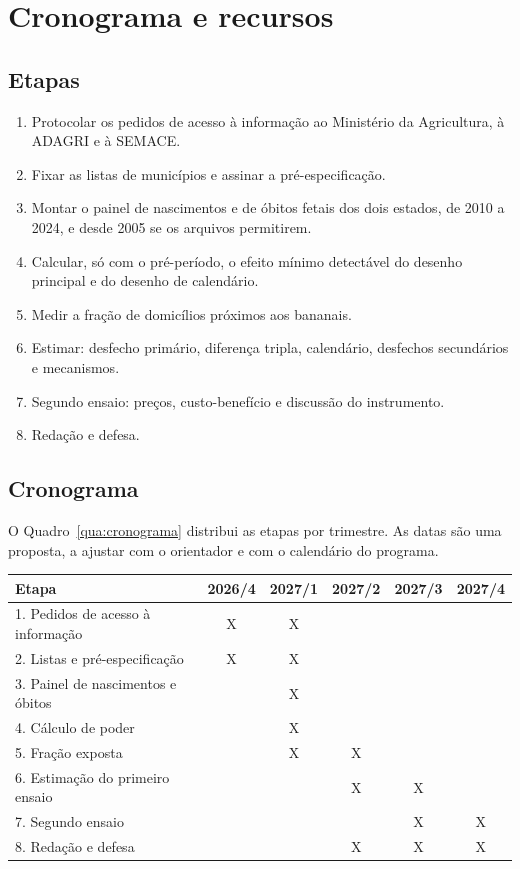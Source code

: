 \chapter{Cronograma e recursos}
\label{sec:cronograma}

\section{Etapas}

\begin{enumerate}
\item Protocolar os pedidos de acesso à informação ao Ministério da
Agricultura, à ADAGRI e à SEMACE.
\item Fixar as listas de municípios e assinar a pré-especificação.
\item Montar o painel de nascimentos e de óbitos fetais dos dois estados, de
2010 a 2024, e desde 2005 se os arquivos permitirem.
\item Calcular, só com o pré-período, o efeito mínimo detectável do desenho
principal e do desenho de calendário.
\item Medir a fração de domicílios próximos aos bananais.
\item Estimar: desfecho primário, diferença tripla, calendário, desfechos
secundários e mecanismos.
\item Segundo ensaio: preços, custo-benefício e discussão do instrumento.
\item Redação e defesa.
\end{enumerate}

\section{Cronograma}

O Quadro~\ref{qua:cronograma} distribui as etapas por trimestre. As datas são
uma proposta, a ajustar com o orientador e com o calendário do programa.

\begin{quadro}[ht]
\centering\small
\caption{Cronograma proposto}
\label{qua:cronograma}
\begin{tabular}{|l|c|c|c|c|c|}
\hline
Etapa & 2026/4 & 2027/1 & 2027/2 & 2027/3 & 2027/4 \\
\hline
1. Pedidos de acesso à informação & X & X & & & \\ \hline
2. Listas e pré-especificação     & X & X & & & \\ \hline
3. Painel de nascimentos e óbitos &   & X & & & \\ \hline
4. Cálculo de poder               &   & X & & & \\ \hline
5. Fração exposta                 &   & X & X & & \\ \hline
6. Estimação do primeiro ensaio   &   &   & X & X & \\ \hline
7. Segundo ensaio                 &   &   &   & X & X \\ \hline
8. Redação e defesa               &   &   & X & X & X \\ \hline
\end{tabular}
\end{quadro}

